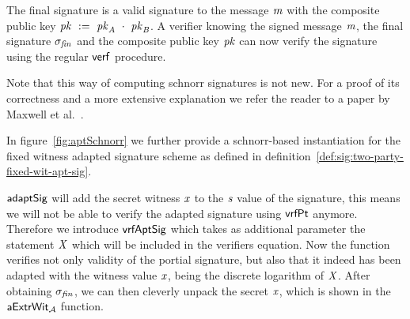 The final signature is a valid signature to the message $\mathit{m}$ with the composite public key $\mathit{pk} ~:=~ \mathit{pk}_{\mathit{A}} ~\cdot~ \mathit{pk}_{\mathit{B}}$.
A verifier knowing the signed message $\mathit{m}$, the final signature $\sigma_{\mathit{fin}}$ and the composite public key $\mathit{pk}$ can now verify the signature using the regular $\mathsf{verf}$ procedure.

Note that this way of computing schnorr signatures is not new.
For a proof of its correctness and a more extensive explanation we refer the reader to a paper by Maxwell et al.~\cite{maxwell2019simple}.

In figure~\ref{fig:aptSchnorr} we further provide a schnorr-based instantiation for the fixed witness adapted signature scheme as defined in definition~\ref{def:sig:two-party-fixed-wit-apt-sig}.

$\mathsf{adaptSig}$ will add the secret witness $\mathit{x}$ to the $\mathit{s}$ value of the signature, this means we will not be able to verify the adapted signature using $\mathsf{vrfPt}$ anymore. Therefore we
introduce $\mathsf{vrfAptSig}$ which takes as additional parameter the statement $\mathit{X}$ which will be included in the verifiers equation. Now the function verifies not only validity of the portial
signature, but also that it indeed has been adapted with the witness value $\mathit{x}$, being the discrete logarithm of $\mathit{X}$. After obtaining $\sigma_{\mathit{fin}}$, we can then cleverly unpack the secret $\mathit{x}$,
which is shown in the $\mathsf{aExtrWit_{\mathcal{A}}}$ function.

